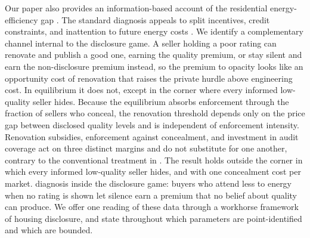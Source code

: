 Our paper also provides an information-based account of the residential energy-efficiency gap
\citep{allcott_is_2012, gerarden_assessing_2017}. The standard diagnosis appeals to split
incentives, credit constraints, and inattention to future energy costs \citep{allcott_consumers_2011, sallee_rational_2014, allcott_evaluating_2015}. We identify a
complementary channel internal to the disclosure game. A seller holding a poor rating can
renovate and publish a good one, earning the quality premium, or stay silent and earn the
non-disclosure premium instead, so the premium to opacity looks like an opportunity cost of
renovation that raises the private hurdle above engineering cost. In equilibrium it does not, except in the corner where every informed low-quality seller hides. Because the equilibrium absorbs enforcement through the fraction of sellers who
conceal, the renovation threshold depends only on the price gap between disclosed quality
levels and is independent of enforcement intensity. Renovation subsidies, enforcement against
concealment, and investment in audit coverage act on three distinct margins and do not substitute for one another,
contrary to the conventional treatment in
\citet{gillingham_palmer_2014}. The result holds outside the corner in which every informed low-quality seller hides, and with one concealment cost per market. %
diagnosis inside the disclosure game: buyers who attend less to energy when no rating is shown let
silence earn a premium that no belief about quality can produce. We offer one reading of these data through a workhorse framework of housing
disclosure, and state throughout which parameters are point-identified and which are bounded.

